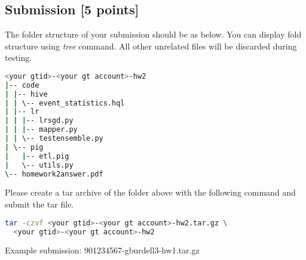\documentclass[12pt]{article}
\begin{document}
\subsection{Submission [5 points]}
The folder structure of your submission should be as below. You can display fold structure using \textit{tree} command. All other unrelated files will be discarded during testing.
\begin{lstlisting}[language=bash,frame=single]
<your gtid>-<your gt account>-hw2
|-- code
| |-- hive
| | \-- event_statistics.hql
| |-- lr
| | |-- lrsgd.py
| | |-- mapper.py
| | \-- testensemble.py
| \-- pig
|   |-- etl.pig
|   \-- utils.py
\-- homework2answer.pdf
\end{lstlisting}

Please create a tar archive of the folder above with the following command and submit the tar file.
\begin{lstlisting}[language=bash,frame=single]
tar -czvf <your gtid>-<your gt account>-hw2.tar.gz \
  <your gtid>-<your gt account>-hw2
\end{lstlisting}
Example submission: 901234567-gburdell3-hw1.tar.gz
\end{document}
